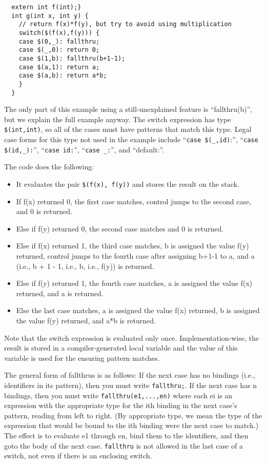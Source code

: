 \begin{verbatim}
  extern int f(int);}
  int g(int x, int y) {
    // return f(x)*f(y), but try to avoid using multiplication
    switch($(f(x),f(y))) {
    case $(0,_): fallthru;
    case $(_,0): return 0;
    case $(1,b): fallthru(b+1-1);
    case $(a,1): return a;
    case $(a,b): return a*b;
    }
  }
\end{verbatim}

The only part of this example using a still-unexplained feature is
``fallthru(b)'', but we explain the full example anyway.  The switch
expression has type \texttt{\$(int,int)}, so all of the cases must
have patterns that match this type.  Legal case forms for this type
not used in the example include ``\texttt{case \$(_,id)}:'',
``\texttt{case \$(id,_):}'',
``\texttt{case id:}'',
``\texttt{case _:}'',
and
``default:''.

The code does the following:

\begin{itemize}
\item It evaluates the pair \texttt{\$(f(x), f(y))} and stores the
  result on the stack.
\item If f(x) returned 0, the first case matches, control jumps to the second
  case, and 0 is returned. 
\item Else if f(y) returned 0, the second case matches and 0 is returned.  
\item Else if f(x) returned 1, the third case matches, b is assigned the value
  f(y) returned, control jumps to the fourth case after assigning b+1-1 to a,
  and a (i.e., b + 1 - 1, i.e., b, i.e., f(y)) is returned.
\item Else if f(y) returned 1, the fourth case matches, a is assigned the value
  f(x) returned, and a is returned.
\item Else the last case matches, a is assigned the value f(x) returned, b is
  assigned the value f(y) returned, and a*b is returned.
\end{itemize}

Note that the switch expression is evaluated only once.
Implementation-wise, the result is stored in a compiler-generated
local variable and the value of this variable is used for the ensuring
pattern matches.

The general form of fallthrus is as follows: If the next case has no
bindings (i.e., identifiers in its pattern), then you must write
\texttt{fallthru;}.  If the next case has n bindings, then you must
write \texttt{fallthru(e1,...,en)} where each ei is an expression with
the appropriate type for the ith binding in the next case's pattern,
reading from left to right.  (By appropriate type, we mean the type of
the expression that would be bound to the ith binding were the next
case to match.)  The effect is to evaluate e1 through en, bind them to
the identifiers, and then goto the body of the next case.
\texttt{fallthru} is not allowed in the last case of a switch, not
even if there is an enclosing switch.

